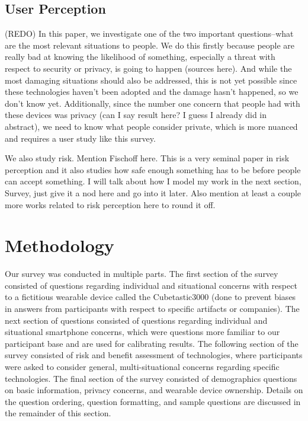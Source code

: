 \documentclass{acm_proc_article-sp}
\begin{document}
\subsection{User Perception}
(REDO) In this paper, we investigate one of the two important questions--what are the most relevant situations to people. We do this firstly because people are really bad at knowing the likelihood of something, especially a threat with respect to security or privacy, is going to happen (sources here). And while the most damaging situations should also be addressed, this is not yet possible since these technologies haven't been adopted and the damage hasn't happened, so we don't know yet. Additionally, since the number one concern that people had with these devices was privacy (can I say result here? I guess I already did in abstract), we need to know what people consider private, which is more nuanced and requires a user study like this survey. 

We also study risk. Mention Fischoff here. This is a very seminal paper in risk perception and it also studies how safe enough something has to be before people can accept something. I will talk about how I model my work in the next section, Survey, just give it a nod here and go into it later. Also mention at least a couple more works related to risk perception here to round it off. 


\section{Methodology}
Our survey was conducted in multiple parts. The first section of the survey consisted of questions regarding individual and situational concerns with respect to a fictitious wearable device called the Cubetastic3000 (done to prevent biases in answers from participants with respect to specific artifacts or companies). The next section of questions consisted of questions regarding individual and situational smartphone concerns, which were questions more familiar to our participant base and are used for calibrating results. The following section of the survey consisted of risk and benefit assessment of technologies, where participants were asked to consider general, multi-situational concerns regarding specific technologies. The final section of the survey consisted of demographics questions on basic information, privacy concerns, and wearable device ownership. Details on the question ordering, question formatting, and sample questions are discussed in the remainder of this section. 
\end{document}

